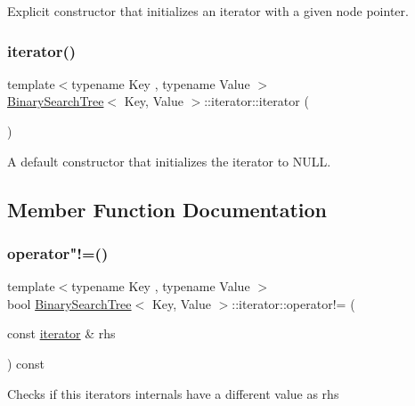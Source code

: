 Explicit constructor that initializes an iterator with a given node pointer. \mbox{\label{classBinarySearchTree_1_1iterator_aaf03ac21b275451f4d849688955d9fe8}} 
\subsubsection{\texorpdfstring{iterator()}{iterator()}\hspace{0.1cm}{\footnotesize\ttfamily [2/2]}}
{\footnotesize\ttfamily template$<$typename Key , typename Value $>$ \\
\mbox{\hyperlink{classBinarySearchTree}{Binary\+Search\+Tree}}$<$ Key, Value $>$\+::iterator\+::iterator (\begin{DoxyParamCaption}{ }\end{DoxyParamCaption})}

A default constructor that initializes the iterator to N\+U\+LL. 

\subsection{Member Function Documentation}
\mbox{\label{classBinarySearchTree_1_1iterator_aa785f43b735a4690e05d61b9d955a020}} 
\subsubsection{\texorpdfstring{operator"!=()}{operator!=()}}
{\footnotesize\ttfamily template$<$typename Key , typename Value $>$ \\
bool \mbox{\hyperlink{classBinarySearchTree}{Binary\+Search\+Tree}}$<$ Key, Value $>$\+::iterator\+::operator!= (\begin{DoxyParamCaption}\item[{const \mbox{\hyperlink{classBinarySearchTree_1_1iterator}{iterator}} \&}]{rhs }\end{DoxyParamCaption}) const}

Checks if \textquotesingle{}this\textquotesingle{} iterator\textquotesingle{}s internals have a different value as \textquotesingle{}rhs\textquotesingle{} \mbox{\label{classBinarySearchTree_1_1iterator_a1863c4d0897a26ff5fb18bd05cd3184c}} 
